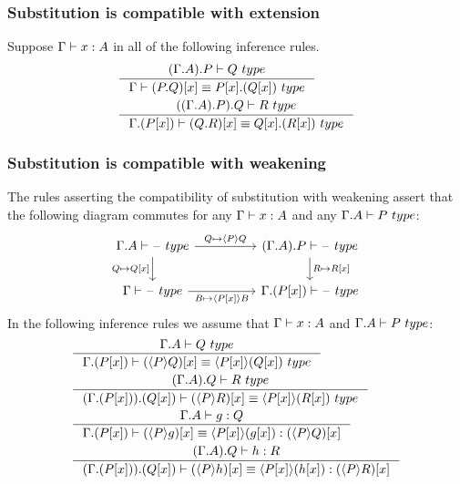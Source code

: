 \subsubsection{Substitution is compatible with extension}
Suppose $\jterm{\Gamma}{A}{x}$ in all of the following inference rules.
\begin{align}
& \inference{\jtype{\ctxext{{\Gamma}{A}}{P}}{Q}}
  {\jtypeeq{\Gamma}{\subst{x}{\ctxext{P}{Q}}}{\ctxext{\subst{x}{P}}{\subst{x}{Q}}}}\\
& \inference{\jtype{\ctxext{{{\Gamma}{A}}{P}}{Q}}{R}}
  {\jtypeeq{\ctxext{\Gamma}{\subst{x}{P}}}{\subst{x}{\ctxext{Q}{R}}}{\ctxext{\subst{x}{Q}}{\subst{x}{R}}}}
\end{align}

\subsubsection{Substitution is compatible with weakening}
The rules asserting the compatibility of substitution with weakening assert
that the following diagram commutes for any $\jterm{\Gamma}{A}{x}$ and any
$\jtype{\ctxext{\Gamma}{A}}{P}$:
\begin{equation*}
\begin{tikzcd}[column sep=huge]
\jtype{\ctxext{\Gamma}{A}}{\blank} \ar{d}[swap]{Q\mapsto\subst{x}{Q}} \ar{r}{Q\mapsto\ctxwk{P}{Q}} & \jtype{\ctxext{{\Gamma}{A}}{P}}{\blank} \ar{d}{R\mapsto\subst{x}{R}}\\ 
\jtype{\Gamma}{\blank} \ar{r}[swap]{B\mapsto\ctxwk{\subst{x}{P}}{B}} & \jtype{\ctxext{\Gamma}{\subst{x}{P}}}{\blank}
\end{tikzcd}
\end{equation*}
In the following inference rules we assume that $\jterm{\Gamma}{A}{x}$ and
$\jtype{\ctxext{\Gamma}{A}}{P}$:
\begin{align}
& \inference
    {\jtype{\ctxext{\Gamma}{A}}{Q}}
    {\jtypeeq{\ctxext{\Gamma}{\subst{x}{P}}}{\subst{x}{\ctxwk{P}{Q}}}{\ctxwk{\subst{x}{P}}{\subst{x}{Q}}}}\\
& \inference
    {\jtype{\ctxext{{\Gamma}{A}}{Q}}{R}}
    {\jtypeeq{\ctxext{{\Gamma}{\subst{x}{P}}}{\subst{x}{Q}}}{\subst{x}{\ctxwk{P}{R}}}{\ctxwk{\subst{x}{P}}{\subst{x}{R}}}}\\
& \inference
    {\jterm{\ctxext{\Gamma}{A}}{Q}{g}}
    {\jtermeq
      {\ctxext{\Gamma}{\subst{x}{P}}}
      {\subst{x}{\ctxwk{P}{Q}}}
      {\subst{x}{\ctxwk{P}{g}}}
      {\ctxwk{\subst{x}{P}}{\subst{x}{g}}}}\\
& \inference
    {\jterm{\ctxext{{\Gamma}{A}}{Q}}{R}{h}}
    {\jtermeq
      {\ctxext{{\Gamma}{\subst{x}{P}}}{\subst{x}{Q}}}
      {\subst{x}{\ctxwk{P}{R}}}
      {\subst{x}{\ctxwk{P}{h}}}
      {\ctxwk{\subst{x}{P}}{\subst{x}{h}}}}
\end{align}


